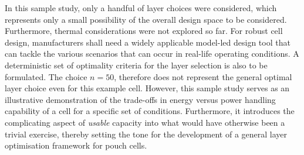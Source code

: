 In this  sample study, only  a handful of  layer choices were  considered, which
represents  only  a  small  possibility  of  the  overall  design  space  to  be
considered. Furthermore,  thermal considerations were  not explored so  far. For
robust  cell design,  manufacturers  shall need  a  widely applicable  model-led
design tool  that can tackle the  various scenarios that can  occur in real-life
operating conditions. A  deterministic set of optimality criteria  for the layer
selection  is also  to  be formulated.  The choice  $n=50$,  therefore does  not
represent the general optimal layer choice  even for this example cell. However,
this sample study  serves as an illustrative demonstration of  the trade-offs in
energy  versus  power handling  capability  of  a cell  for  a  specific set  of
conditions. Furthermore, it introduces  the complicating aspect of \emph{usable}
capacity into what would have otherwise been a trivial exercise, thereby setting
the tone for the development of a general layer optimisation framework for pouch
cells.

